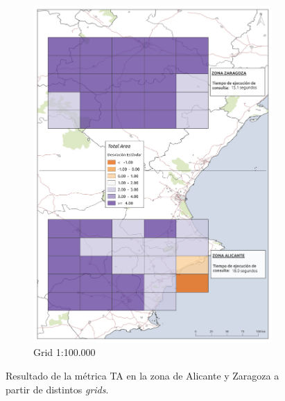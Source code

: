 \begin{figure}
\begin{subfigure}[b]{0.4\textwidth}
    \includegraphics[width=\textwidth]{ResultadosyDiscusion/Figs/Results/l_100.pdf}
    \caption{Grid 1:100.000}
    \label{fig:l_100}
  \end{subfigure}
  
  \caption{Resultado de la métrica TA en la zona de Alicante y Zaragoza a partir de distintos \textit{grids}.}
  \label{fig:l_area}
\end{figure}